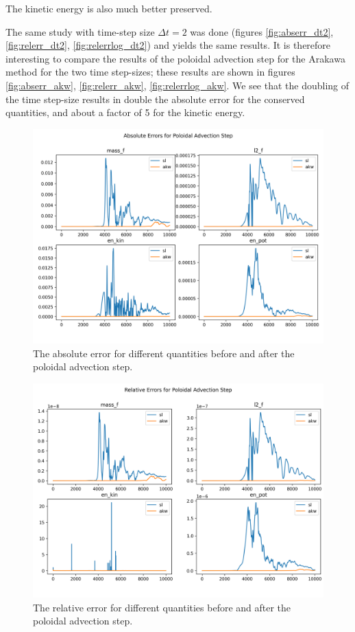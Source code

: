 The kinetic energy is also much better preserved.

The same study with time-step size $\Delta t = 2$ was done (figures \ref{fig:abserr_dt2}, \ref{fig:relerr_dt2}, \ref{fig:relerrlog_dt2}) and yields the same results. It is therefore interesting to compare the results of the poloidal advection step for the Arakawa method for the two time step-sizes; these results are shown in figures \ref{fig:abserr_akw}, \ref{fig:relerr_akw}, \ref{fig:relerrlog_akw}. We see that the doubling of the time step-size results in double the absolute error for the conserved quantities, and about a factor of 5 for the kinetic energy.

\begin{figure}
	\centering
	\includegraphics[width=0.9\linewidth]{abs_err}
	\caption{The absolute error for different quantities before and after the poloidal advection step.}
	\label{fig:abserr}
\end{figure}


\begin{figure}
	\centering
	\includegraphics[width=0.9\linewidth]{rel_err}
	\caption{The relative error for different quantities before and after the poloidal advection step.}
	\label{fig:relerr}
\end{figure}


